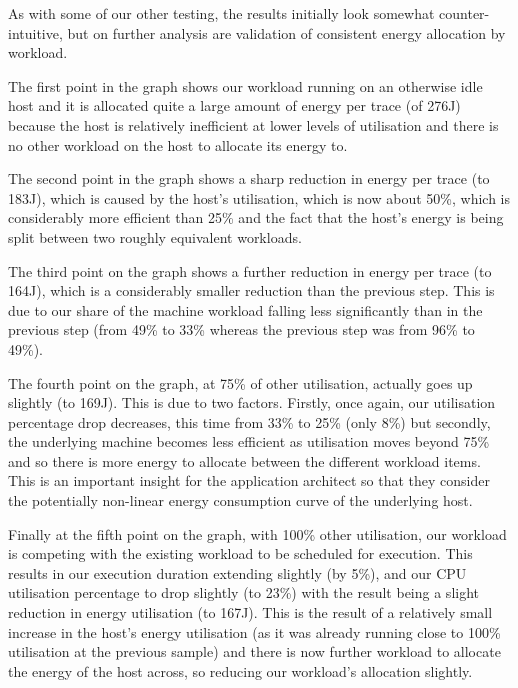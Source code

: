 As with some of our other testing, the results initially look somewhat counter-intuitive, but on further analysis are validation of consistent energy allocation by workload.


The first point in the graph shows our workload running on an otherwise idle host and it is allocated quite a large amount of energy per trace (of 276J) because the host is relatively inefficient at lower levels of utilisation and there is no other workload on the host to allocate its energy to.

The second point in the graph shows a sharp reduction in energy per trace (to 183J), which is caused by the host's utilisation, which is now about 50\%, which is considerably more efficient than 25\% and the fact that the host's energy is being split between two roughly equivalent workloads.

The third point on the graph shows a further reduction in energy per trace (to 164J), which is a considerably smaller reduction than the previous step.  This is due to our share of the machine workload falling less significantly than in the previous step (from 49\% to 33\% whereas the previous step was from 96\% to 49\%).

The fourth point on the graph, at 75\% of other utilisation, actually goes up slightly (to 169J).  This is due to two factors.  Firstly, once again, our utilisation percentage drop decreases, this time from 33\% to 25\% (only 8\%) but secondly, the underlying machine becomes less efficient as utilisation moves beyond 75\% and so there is more energy to allocate between the different workload items.  This is an important insight for the application architect so that they consider the potentially non-linear energy consumption curve of the underlying host.

Finally at the fifth point on the graph, with 100\% other utilisation, our workload is competing with the existing workload to be scheduled for execution.  This results in our execution duration extending slightly (by 5\%), and our CPU utilisation percentage to drop slightly (to 23\%) with the result being a slight reduction in energy utilisation (to 167J).  This is the result of a relatively small increase in the host's energy utilisation (as it was already running close to 100\% utilisation at the previous sample) and there is now further workload to allocate the energy of the host across, so reducing our workload's allocation slightly.


